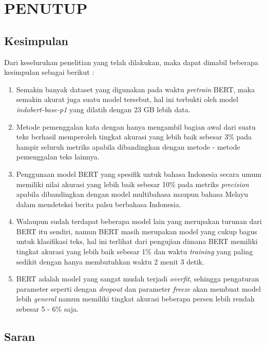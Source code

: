 \chapter{PENUTUP}
\label{chap:penutup}


\section{Kesimpulan}
\label{sec:kesimpulan}

Dari keseluruhan penelitian yang telah dilakukan, maka dapat dimabil beberapa kesimpulan sebagai berikut :

\begin{enumerate}[nolistsep]

  \item Semakin banyak dataset yang digunakan pada waktu \textit{pretrain} BERT, maka semakin akurat juga suatu model tersebut, hal ini terbukti oleh model \textit{indobert-base-p1} yang dilatih dengan 23 GB lebih data.
  \item Metode pemenggalan kata dengan hanya mengambil bagian awal dari suatu teks berhasil memperoleh tingkat akurasi yang lebih baik sebesar 3\% pada hampir seluruh metriks apabila dibandingkan dengan metode - metode pemenggalan teks lainnya.
  \item Penggunaan model BERT yang spesifik untuk bahasa Indonesia secara umum memiliki nilai akurasi yang lebih baik sebesar 10\% pada metriks \textit{precision} apabila dibandingkan dengan model multibahasa maupun bahasa Melayu dalam mendeteksi berita palsu berbahasa Indonesia.
  \item Walaupun sudah terdapat beberapa model lain yang merupakan turunan dari BERT itu sendiri, namun BERT masih merupakan model yang cukup bagus untuk klasifikasi teks, hal ini terlihat dari pengujian dimana BERT memiliki tingkat akurasi yang lebih baik sebesar 1\% dan waktu \textit{training} yang paling sedikit dengan hanya membutuhkan waktu 2 menit 3 detik.
  \item BERT adalah model yang sangat mudah terjadi \textit{overfit}, sehingga pengaturan parameter seperti dengan \textit{dropout} dan parameter \textit{freeze} akan membuat model lebih \textit{general} namun memiliki tingkat akurasi beberapa persen lebih rendah sebesar 5 - 6\% saja.

\end{enumerate}

\section{Saran}
\label{chap:saran}

